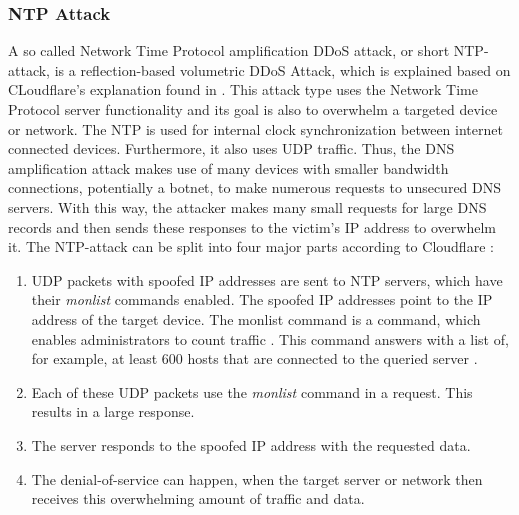 \subsubsection*{NTP Attack}
A so called Network Time Protocol amplification DDoS attack, or short NTP-attack, is a reflection-based volumetric DDoS Attack, which is explained based on CLoudflare's explanation found in \cite{Cloudflare-NTP}. This attack type uses the Network Time Protocol server functionality and its goal is also to overwhelm a targeted device or network. The NTP is used for internal clock synchronization between internet connected devices. Furthermore, it also uses UDP traffic. Thus, the DNS amplification attack makes use of many devices with smaller bandwidth connections, potentially a botnet, to make numerous requests to unsecured DNS servers. With this way, the attacker makes many small requests for large DNS records and then sends these responses to the victim's IP address to overwhelm it. The NTP-attack can be split into four major parts according to Cloudflare \cite{Cloudflare-NTP}:
\begin{enumerate}
    \item UDP packets with spoofed IP addresses are sent to NTP servers, which have their \textit{monlist} commands enabled. The spoofed IP addresses point to the IP address of the target device. The monlist command is a command, which enables administrators to count traffic \cite{Imperva-NTP}. This command answers with a list of, for example, at least 600 hosts that are connected to the queried server \cite{Imperva-NTP}.  
    \item Each of these UDP packets use the \textit{monlist} command in a request. This results in a large response. 
    \item The server responds to the spoofed IP address with the requested data. 
    \item The denial-of-service can happen, when the target server or network then receives this overwhelming amount of traffic and data. 
\end{enumerate}

